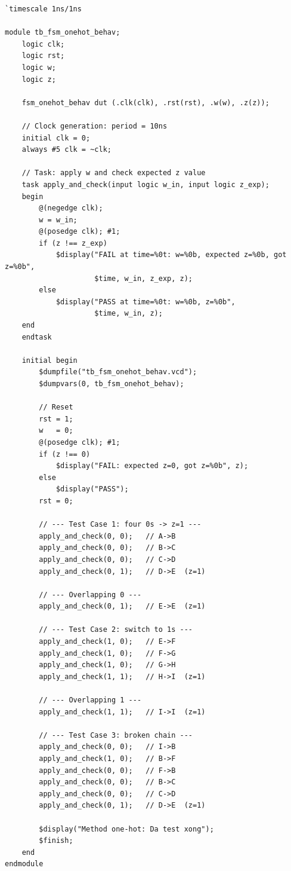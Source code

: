 \documentclass[12pt, a4paper]{article}
\begin{document}
\begin{lstlisting}[caption={\texttt{01\_tb/tb\_fsm\_onehot\_behav.sv} -- Testbench cho fsm\_onehot\_behav.},
                   label={lst:exp4-tb-oh}]
`timescale 1ns/1ns

module tb_fsm_onehot_behav;
    logic clk;
    logic rst;
    logic w;
    logic z;

    fsm_onehot_behav dut (.clk(clk), .rst(rst), .w(w), .z(z));

    // Clock generation: period = 10ns
    initial clk = 0;
    always #5 clk = ~clk;

    // Task: apply w and check expected z value
    task apply_and_check(input logic w_in, input logic z_exp);
    begin
        @(negedge clk);
        w = w_in;
        @(posedge clk); #1;
        if (z !== z_exp)
            $display("FAIL at time=%0t: w=%0b, expected z=%0b, got z=%0b",
                     $time, w_in, z_exp, z);
        else
            $display("PASS at time=%0t: w=%0b, z=%0b",
                     $time, w_in, z);
    end
    endtask

    initial begin
        $dumpfile("tb_fsm_onehot_behav.vcd");
        $dumpvars(0, tb_fsm_onehot_behav);

        // Reset
        rst = 1;
        w   = 0;
        @(posedge clk); #1;
        if (z !== 0)
            $display("FAIL: expected z=0, got z=%0b", z);
        else
            $display("PASS");
        rst = 0;

        // --- Test Case 1: four 0s -> z=1 ---
        apply_and_check(0, 0);   // A->B
        apply_and_check(0, 0);   // B->C
        apply_and_check(0, 0);   // C->D
        apply_and_check(0, 1);   // D->E  (z=1)

        // --- Overlapping 0 ---
        apply_and_check(0, 1);   // E->E  (z=1)

        // --- Test Case 2: switch to 1s ---
        apply_and_check(1, 0);   // E->F
        apply_and_check(1, 0);   // F->G
        apply_and_check(1, 0);   // G->H
        apply_and_check(1, 1);   // H->I  (z=1)

        // --- Overlapping 1 ---
        apply_and_check(1, 1);   // I->I  (z=1)

        // --- Test Case 3: broken chain ---
        apply_and_check(0, 0);   // I->B
        apply_and_check(1, 0);   // B->F
        apply_and_check(0, 0);   // F->B
        apply_and_check(0, 0);   // B->C
        apply_and_check(0, 0);   // C->D
        apply_and_check(0, 1);   // D->E  (z=1)

        $display("Method one-hot: Da test xong");
        $finish;
    end
endmodule
\end{lstlisting}
\end{document}
